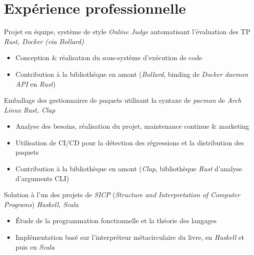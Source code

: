 \documentclass{resume}
\begin{document}
\section{Expérience professionnelle}
Projet en équipe, système de style \textit{Online Judge} automatisant l'évaluation des TP \hfill \textit{Rust, Docker (via Bollard)}
\begin{itemize}
  \item Conception \& réalisation du sous-système d'exécution de code
  \item Contribution à la bibliothèque en amont (\textit{Bollard}, binding de \textit{Docker daemon API} en \textit{Rust})
\end{itemize}

Emballage des gestionnaires de paquets utilisant la syntaxe de \textit{pacman} de \textit{Arch Linux} \hfill \textit{Rust, Clap}
\begin{itemize}
  \item Analyse des besoins, réalisation du projet, maintenance continue \& marketing
  \item Utilisation de CI/CD pour la détection des régressions et la distribution des paquets
  \item Contribution à la bibliothèque en amont (\textit{Clap}, bibliothèque \textit{Rust} d'analyse d'arguments CLI)
\end{itemize}

Solution à l'un des projets de \textit{SICP} (\textit{Structure and Interpretation of Computer Programs}) \hfill \textit{Haskell, Scala}
\begin{itemize}
  \item Étude de la programmation fonctionnelle et la théorie des langages
  \item Implémentation basé sur l'interpréteur métacirculaire du livre, en \textit{Haskell} et puis en \textit{Scala}
\end{itemize}

\end{document}
